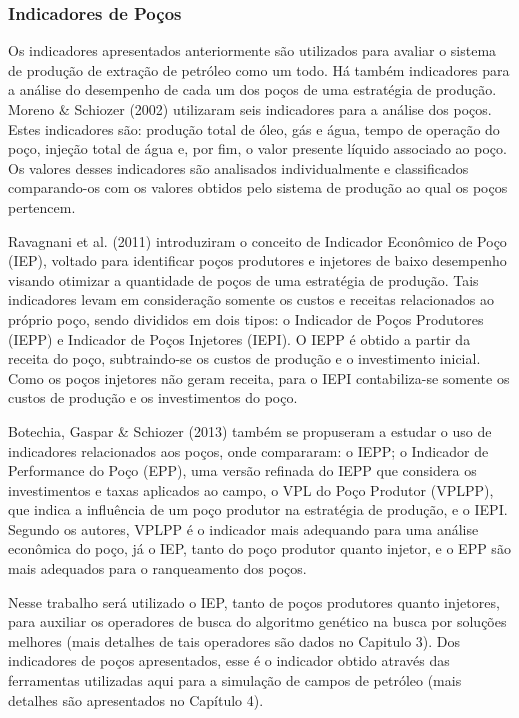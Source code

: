 \subsubsection{Indicadores de Poços}

Os indicadores apresentados anteriormente são utilizados para avaliar o sistema de produção de extração de petróleo como um todo. Há também indicadores para a análise do desempenho de cada um dos poços de uma estratégia de produção. Moreno \& Schiozer (2002) utilizaram seis indicadores para a análise dos poços. Estes indicadores são: produção total de óleo, gás e água, tempo de operação do poço, injeção total de água e, por fim, o valor presente líquido associado ao poço.  Os valores desses indicadores são analisados individualmente e classificados comparando-os com os valores obtidos pelo sistema de produção ao qual os poços pertencem.

Ravagnani et al. (2011) introduziram o conceito de Indicador Econômico de Poço (IEP), voltado para identificar poços produtores e injetores de baixo desempenho visando otimizar a quantidade de poços de uma estratégia de produção. Tais indicadores levam em consideração somente os custos e receitas relacionados ao próprio poço, sendo divididos em dois tipos: o Indicador de Poços Produtores (IEPP) e Indicador de Poços Injetores (IEPI). O IEPP é obtido a partir da receita do poço, subtraindo-se os custos de produção e o investimento inicial. Como os poços injetores não geram receita, para o IEPI contabiliza-se somente os custos de produção e os investimentos do poço.

Botechia, Gaspar \& Schiozer (2013) também se propuseram a estudar o uso de indicadores relacionados aos poços, onde compararam: o IEPP; o Indicador de Performance do Poço (EPP), uma versão refinada do IEPP que considera os investimentos e taxas aplicados ao campo, o VPL do Poço Produtor (VPLPP), que indica a influência de um poço produtor na estratégia de produção, e o IEPI. Segundo os autores, VPLPP é o indicador mais adequando para uma análise econômica do poço, já o IEP, tanto do poço produtor quanto injetor, e o EPP são mais adequados para o ranqueamento dos poços.

Nesse trabalho será utilizado o IEP, tanto de poços produtores quanto injetores, para auxiliar os operadores de busca do algoritmo genético na busca por soluções melhores (mais detalhes de tais operadores são dados no Capitulo 3). Dos indicadores de poços apresentados, esse é o indicador obtido através das ferramentas utilizadas aqui para a simulação de campos de petróleo (mais detalhes são apresentados no Capítulo 4).


